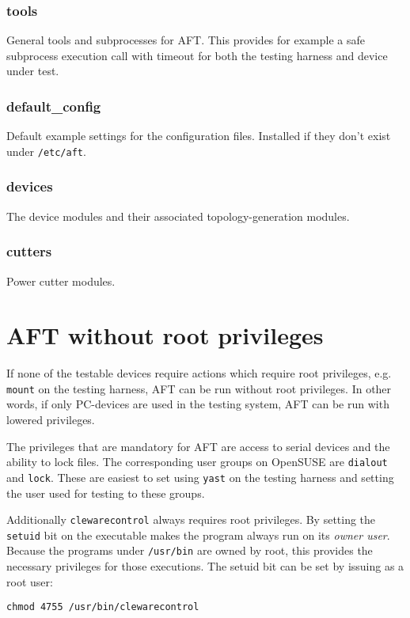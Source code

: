 \documentclass[a4paper,11pt]{article}
\newcommand{\cmd}[1]{\texttt{#1}}
\begin{document}
\subsubsection*{tools}
General tools and subprocesses for AFT. This provides for example a safe subprocess execution call with timeout for both the testing harness and device under test.

\subsubsection*{default\_config}
Default example settings for the configuration files. Installed if they don't exist under \cmd{/etc/aft}.

\subsubsection*{devices}
The device modules and their associated topology-generation modules.

\subsubsection*{cutters}
Power cutter modules.

\section{AFT without root privileges}
\label{app:noroot}

If none of the testable devices require actions which require root privileges, e.g. \cmd{mount} on the testing harness, AFT can be run without root privileges. In other words, if only PC-devices are used in the testing system, AFT can be run with lowered privileges.

The privileges that are mandatory for AFT are access to serial devices and the ability to lock files. The corresponding user groups on OpenSUSE are \cmd{dialout} and \cmd{lock}. These are easiest to set using \cmd{yast} on the testing harness and setting the user used for testing to these groups.

Additionally \cmd{clewarecontrol} always requires root privileges. By setting the \cmd{setuid} bit on the executable makes the program always run on its \emph{owner user}. Because the programs under \cmd{/usr/bin} are owned by root, this provides the necessary privileges for those executions. The setuid bit can be set by issuing as a root user:
\begin{lstlisting}
chmod 4755 /usr/bin/clewarecontrol
\end{lstlisting}
\end{document}
